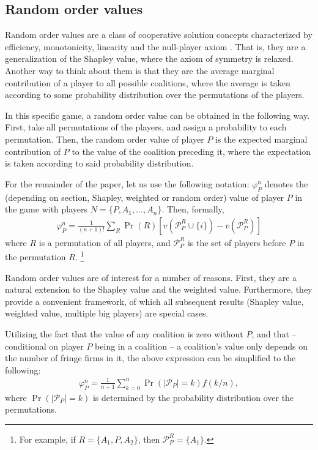 \documentclass[a4paper]{article}
\begin{document}
\subsection{Random order values}

Random order values are a class of cooperative solution concepts characterized by efficiency, monotonicity, linearity and the null-player axiom \parencite{weber1988probabilistic}.
That is, they are a generalization of the Shapley value, where the axiom of symmetry is relaxed.
Another way to think about them is that they are the average marginal contribution of a player to all possible coalitions, where the average is taken according to some probability distribution over the permutations of the players.

In this specific game, a random order value can be obtained in the following way.
First, take all permutations of the players, and assign a probability to each permutation.
Then, the random order value of player $P$ is the expected marginal contribution of $P$ to the value of the coalition preceding it, where the expectation is taken according to said probability distribution.

For the remainder of the paper, let us use the following notation: $\varphi_P^n$ denotes the (depending on section, Shapley, weighted or random order) value of player $P$ in the game with players $N = \{P, A_1, \dots, A_n\}$.
Then, formally,
\begin{align*}
    \varphi_P^n = \frac{1}{(n+1)!} \sum_{R} \Pr(R) [ v(\mathcal{P}_P^R \cup \{i\}) - v(\mathcal{P}_P^R) ]
\end{align*}
where $R$ is a permutation of all players, and $\mathcal{P}_P^R$ is the set of players before $P$ in the permutation $R$. \footnote{
    For example, if $R = \{A_1, P, A_2\}$, then $\mathcal{P}_P^R = \{A_1\}$.
}

Random order values are of interest for a number of reasons.
First, they are a natural extension to the Shapley value and the weighted value.
Furthermore, they provide a convenient framework, of which all subsequent results (Shapley value, weighted value, multiple big players) are special cases.

Utilizing the fact that the value of any coalition is zero without $P$, and that -- conditional on player $P$ being in a coalition -- a coalition's value only depends on the number of fringe firms in it, the above expression can be simplified to the following:
\begin{align*}
    \varphi_P^n = \frac{1}{n+1} \sum_{k=0}^n \Pr(|\mathcal{P}_P| = k) f(k/n),
\end{align*}
where $\Pr(|\mathcal{P}_P| = k)$ is determined by the probability distribution over the permutations.
\end{document}
